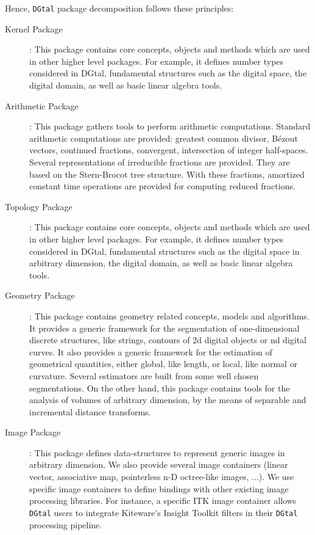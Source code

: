\documentclass[11pt, a4paper]{article}
\def\DGtal{\texttt{DGtal} }
\begin{document}
Hence, \DGtal package decomposition follows these principles:
\begin{description}
  \item[Kernel Package]: This package contains core concepts, objects
    and methods which are used in other higher level packages. For
    example, it defines number types considered in DGtal, fundamental
    structures such as the digital space, the digital domain, as well
    as basic linear algebra tools.

  \item[Arithmetic Package]: This package gathers tools to perform
    arithmetic computations. Standard arithmetic computations are
    provided: greatest common divisor, Bézout vectors, continued
    fractions, convergent, intersection of integer
    half-spaces. Several representations of irreducible fractions are
    provided. They are based on the Stern-Brocot tree structure. With
    these fractions, amortized constant time operations are provided
    for computing reduced fractions. 



  \item[Topology Package]: This package contains core concepts,
    objects and methods which are used in other higher level
    packages. For example, it defines number types considered in
    DGtal, fundamental structures such as the digital space in
    arbitrary dimension, the digital domain, as well as basic linear
    algebra tools.

  \item[Geometry Package]: This package contains geometry related
    concepts, models and algorithms. It provides a generic framework
    for the segmentation of one-dimensional discrete structures, like
    strings, contours of 2d digital objects or nd digital curves. It
    also provides a generic framework for the estimation of
    geometrical quantities, either global, like length, or local, like
    normal or curvature. Several estimators are built from some well
    chosen segmentations. On the other hand, this package contains
    tools for the analysis of volumes of arbitrary dimension, by the
    means of separable and incremental distance transforms.


  \item[Image Package]: This package defines data-structures to
    represent generic images in arbitrary dimension. We also provide
    several image containers (linear vector, associative map,
    pointerless n-D octree-like images, ...). We use specific image
    containers to define bindings with other existing image processing
    libraries. For instance, a specific ITK image container allows
    \DGtal users to integrate Kiteware's Insight Toolkit filters in
    their \DGtal processing pipeline. 


\end{description}
\end{document}
